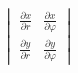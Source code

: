 \documentclass[preview]{standalone}
\begin{document}
\begin{align*}
\begin{vmatrix}\frac{\partial x}{\partial r} & \frac{\partial x}{\partial \varphi} \\\frac{\partial y}{\partial r} & \frac{\partial y}{\partial \varphi}\end{vmatrix}
\end{align*}
\end{document}
